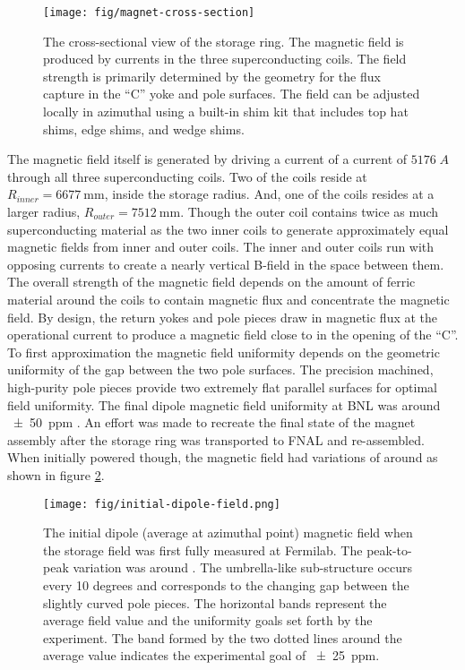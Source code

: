 \begin{figure}
\label{fig:magnet-cross-section}
\centering
\texttt{[image: fig/magnet-cross-section]}
\caption{The cross-sectional view of the storage ring.  The magnetic field is produced by currents in the three superconducting coils.  The field strength is primarily determined by the geometry for the flux capture in the ``C'' yoke and pole surfaces.  The field can be adjusted locally in azimuthal using a built-in shim kit that includes top hat shims, edge shims, and wedge shims.}
\end{figure}

The magnetic field itself is generated by driving a current of a current of $5176\;A$ through all three superconducting coils.  Two of the coils reside at $R_{inner} = \SI{6677}{\mm}$, inside the storage radius. And, one of the coils resides at a larger radius, $R_{outer} = \SI{7512}{\mm}$.  Though the outer coil contains twice as much superconducting material as the two inner coils to generate approximately equal magnetic fields from inner and outer coils.  The inner and outer coils run with opposing currents to create a nearly vertical B-field in the space between them.  The overall strength of the magnetic field depends on the amount of ferric material around the coils to contain magnetic flux and concentrate the magnetic field.  By design, the return yokes and pole pieces draw in magnetic flux at the operational current to produce a magnetic field close to \bmagic in the opening of the ``C''.  To first approximation the magnetic field uniformity depends on the geometric uniformity of the gap between the two pole surfaces.  The precision machined, high-purity pole pieces provide two extremely flat parallel surfaces for optimal field uniformity.  The final dipole magnetic field uniformity at BNL was around \SI{\pm50}{ppm} \cite{e821-prd}. An effort was made to recreate the final state of the magnet assembly after the storage ring was transported to FNAL and re-assembled.  When initially powered though, the magnetic field had variations of around  as shown in figure \ref{fig:initial-field}.

\begin{figure}
\label{fig:initial-field}
\centering
\texttt{[image: fig/initial-dipole-field.png]}
\caption{The initial dipole (average at azimuthal point) magnetic field when the storage field was first fully measured at Fermilab.  The peak-to-peak variation was around .  The umbrella-like sub-structure occurs every 10 degrees and corresponds to the changing gap between the slightly curved pole pieces.  The horizontal bands represent the average field value and the uniformity goals set forth by the experiment.  The band formed by the two dotted lines around the average value indicates the experimental goal of \SI{\pm 25}{ppm}.}
\end{figure}

